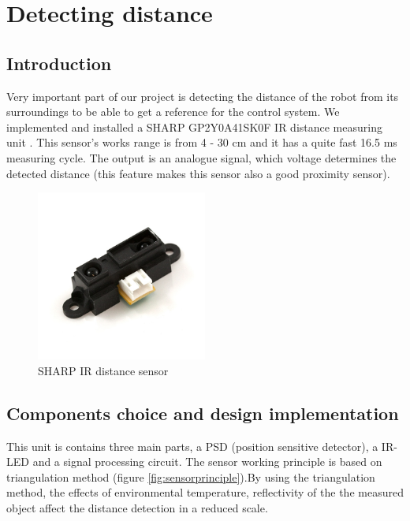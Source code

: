 \chapter{Detecting distance}
\label{chap:Detecting}

\section{Introduction}
Very important part of our project is detecting the distance of the robot from its surroundings to be able to get a reference for the control system. We implemented and installed a SHARP GP2Y0A41SK0F IR distance measuring unit \cite{sensor}. This sensor's works range is from 4 - 30 cm and it has a quite fast 16.5 ms measuring cycle. The output is an analogue signal, which voltage determines the detected distance (this feature makes this sensor also a good proximity sensor). 


\begin{figure}[!ht]
	\centering
	\includegraphics[width=0.5\textwidth]{figures/sensor}
	\caption{SHARP IR distance sensor}
	\label{fig:sensor}
\end{figure}
\section{Components choice and design implementation}
This unit is contains three main parts, a PSD (position sensitive detector), a IR-LED and a signal processing circuit. The sensor working principle is based on triangulation method (figure \ref{fig:sensorprinciple}).By using the triangulation method, the effects of environmental temperature, reflectivity of the the measured object affect the distance detection in a reduced scale. 

